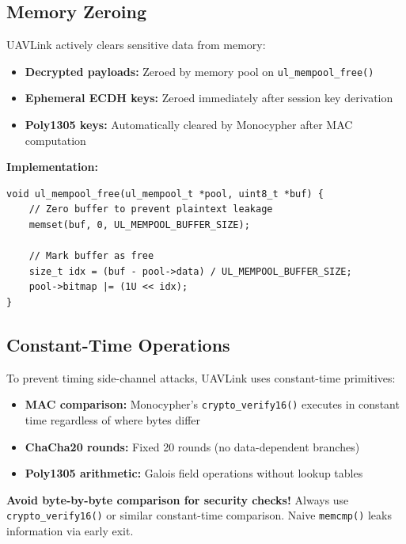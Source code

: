 \documentclass[11pt,a4paper]{article}
\begin{document}
\subsection{Memory Zeroing}

UAVLink actively clears sensitive data from memory:

\begin{itemize}[noitemsep]
    \item \textbf{Decrypted payloads:} Zeroed by memory pool on \texttt{ul\_mempool\_free()}
    \item \textbf{Ephemeral ECDH keys:} Zeroed immediately after session key derivation
    \item \textbf{Poly1305 keys:} Automatically cleared by Monocypher after MAC computation
\end{itemize}

\textbf{Implementation:}
\begin{lstlisting}
void ul_mempool_free(ul_mempool_t *pool, uint8_t *buf) {
    // Zero buffer to prevent plaintext leakage
    memset(buf, 0, UL_MEMPOOL_BUFFER_SIZE);
    
    // Mark buffer as free
    size_t idx = (buf - pool->data) / UL_MEMPOOL_BUFFER_SIZE;
    pool->bitmap |= (1U << idx);
}
\end{lstlisting}

\subsection{Constant-Time Operations}

To prevent timing side-channel attacks, UAVLink uses constant-time primitives:

\begin{itemize}[noitemsep]
    \item \textbf{MAC comparison:} Monocypher's \texttt{crypto\_verify16()} executes in constant time regardless of where bytes differ
    \item \textbf{ChaCha20 rounds:} Fixed 20 rounds (no data-dependent branches)
    \item \textbf{Poly1305 arithmetic:} Galois field operations without lookup tables
\end{itemize}

\begin{warnbox}
\textbf{Avoid byte-by-byte comparison for security checks!} Always use \texttt{crypto\_verify16()} or similar constant-time comparison. Naive \texttt{memcmp()} leaks information via early exit.
\end{warnbox}
\end{document}
